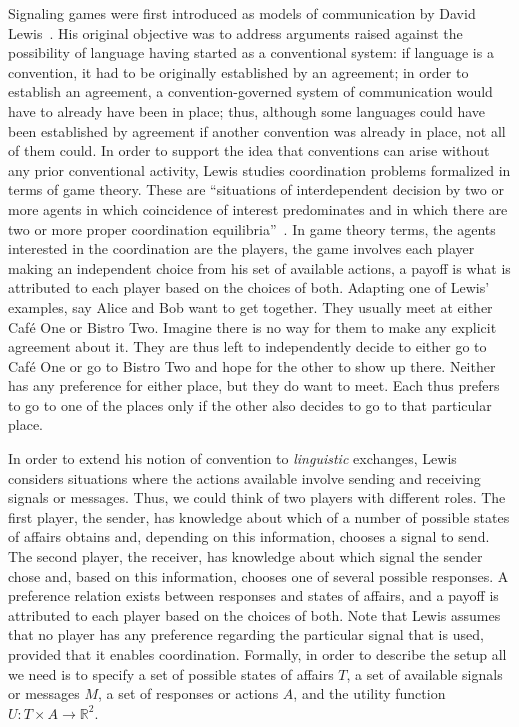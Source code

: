 \documentclass[a4paper]{article}
\begin{document}
Signaling games were first introduced as models of communication by David Lewis~\parencite*{lewis_convention_1969}.
His original objective was to address arguments raised against the possibility of language having started as a conventional system: if language is a convention, it had to be originally established by an agreement; in order to establish an agreement, a convention-governed system of communication would have to already have been in place; thus, although some languages could have been established by agreement if another convention was already in place, not all of them could.
In order to support the idea that conventions can arise without any prior conventional activity, Lewis studies coordination problems formalized in terms of game theory.
These are ``situations of interdependent decision by two or more agents in which coincidence of interest predominates and in which there are two or more proper coordination equilibria''~\parencite*[24]{lewis_convention_1969}.
In game theory terms, the agents interested in the coordination are the players, the game involves each player making an independent choice from his set of available actions, a payoff is what is attributed to each player based on the choices of both.
Adapting one of Lewis' examples, say Alice and Bob want to get together.
They usually meet at either Caf\'e One or Bistro Two.
Imagine there is no way for them to make any explicit agreement about it.
They are thus left to independently decide to either go to Caf\'e One or go to Bistro Two and hope for the other to show up there.
Neither has any preference for either place, but they do want to meet.
Each thus prefers to go to one of the places only if the other also decides to go to that particular place.

In order to extend his notion of convention to \emph{linguistic} exchanges, Lewis considers situations where the actions available involve sending and receiving signals or messages.
Thus, we could think of two players with different roles.
The first player, the sender, has knowledge about which of a number of possible states of affairs obtains and, depending on this information, chooses a signal to send.
The second player, the receiver, has knowledge about which signal the sender chose and, based on this information, chooses one of several possible responses.
A preference relation exists between responses and states of affairs, and a payoff is attributed to each player based on the choices of both.
Note that Lewis assumes that no player has any preference regarding the particular signal that is used, provided that it enables coordination.
Formally, in order to describe the setup all we need is to specify a set of possible states of affairs $T$, a set of available signals or messages $M$, a set of responses or actions $A$, and the utility function $U : T \times A \rightarrow \mathbb{R}^2$.
\end{document}
